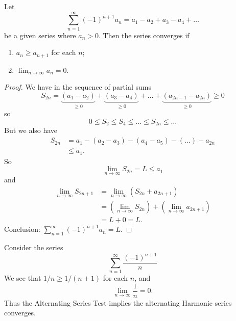 %
 Let
\begin{equation}
\sum^{\infty}_{n=1}(-1)^{n+1}a_{n} =
a_{1}-a_{2}+a_{3}-a_{4}+\dots
\end{equation}
be a given series where $a_{n}>0$. Then the series converges if
\begin{enumerate}
\item $a_{n}\geq a_{n+1}$ for each $n$;
\item $\displaystyle\lim_{n\to\infty}a_{n}=0$.
\end{enumerate}
\begin{proof}
We have in the sequence of partial sums
\begin{equation}
S_{2n}=\underbrace{(a_{1}-a_{2})}_{\geq0}
+\underbrace{(a_{3}-a_{4})}_{\geq0}+\dots+\underbrace{(a_{2n-1}-a_{2n})}_{\geq0}\geq0
\end{equation}
so
\begin{equation}
0\leq S_{2}\leq S_{4}\leq \dots\leq S_{2n}\leq\dots
\end{equation}
But we also have
\begin{equation}
\begin{aligned}
S_{2n} &= a_{1} - (a_{2}-a_{3})-(a_{4}-a_{5})-(\dots)-a_{2n}\\
&\leq a_{1}.
\end{aligned}
\end{equation}
So
\begin{equation}
\lim_{n\to\infty}S_{2n}=L\leq a_{1}
\end{equation}
and
\begin{equation}
\begin{aligned}
\lim_{n\to\infty}S_{2n+1} &=\lim_{n\to\infty}(S_{2n}+a_{2n+1})\\
&=\left(\lim_{n\to\infty}S_{2n}\right)+\left(\lim_{n\to\infty}a_{2n+1}\right)\\
&=L+0=L.
\end{aligned}
\end{equation}
Conclusion: $\displaystyle\sum^{\infty}_{n=1}(-1)^{n+1}a_{n}=L$.
\end{proof}
\begin{example}
Consider the series
\begin{equation}
\sum^{\infty}_{n=1}\frac{(-1)^{n+1}}{n}
\end{equation}
We see that $1/n\geq1/(n+1)$ for each $n$, and 
\begin{equation}
\lim_{n\to\infty}\frac{1}{n}=0.
\end{equation}
Thus the Alternating Series Test implies the alternating Harmonic
series converges.
\end{example}
